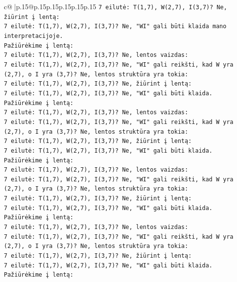 \documentclass{article}
\begin{document}
{\begin{supertabular}{c@{$\;$}|p{.15\linewidth}@{}p{.15\linewidth}p{.15\linewidth}p{.15\linewidth}p{.15\linewidth}p{.15\linewidth}}
{{{\texttt{7 eilutė: T(1,7), W(2,7), I(3,7)? Ne, žiūrint į lentą:} \\
\texttt{7 eilutė: T(1,7), W(2,7), I(3,7)? Ne, "WI" gali būti klaida mano interpretacijoje.} \\
\texttt{Pažiūrėkime į lentą:} \\
\texttt{7 eilutė: T(1,7), W(2,7), I(3,7)? Ne, lentos vaizdas:} \\
\texttt{7 eilutė: T(1,7), W(2,7), I(3,7)? Ne, "WI" gali reikšti, kad W yra (2,7), o I yra (3,7)? Ne, lentos struktūra yra tokia:} \\
\texttt{7 eilutė: T(1,7), W(2,7), I(3,7)? Ne, žiūrint į lentą:} \\
\texttt{7 eilutė: T(1,7), W(2,7), I(3,7)? Ne, "WI" gali būti klaida.} \\
\texttt{Pažiūrėkime į lentą:} \\
\texttt{7 eilutė: T(1,7), W(2,7), I(3,7)? Ne, lentos vaizdas:} \\
\texttt{7 eilutė: T(1,7), W(2,7), I(3,7)? Ne, "WI" gali reikšti, kad W yra (2,7), o I yra (3,7)? Ne, lentos struktūra yra tokia:} \\
\texttt{7 eilutė: T(1,7), W(2,7), I(3,7)? Ne, žiūrint į lentą:} \\
\texttt{7 eilutė: T(1,7), W(2,7), I(3,7)? Ne, "WI" gali būti klaida.} \\
\texttt{Pažiūrėkime į lentą:} \\
\texttt{7 eilutė: T(1,7), W(2,7), I(3,7)? Ne, lentos vaizdas:} \\
\texttt{7 eilutė: T(1,7), W(2,7), I(3,7)? Ne, "WI" gali reikšti, kad W yra (2,7), o I yra (3,7)? Ne, lentos struktūra yra tokia:} \\
\texttt{7 eilutė: T(1,7), W(2,7), I(3,7)? Ne, žiūrint į lentą:} \\
\texttt{7 eilutė: T(1,7), W(2,7), I(3,7)? Ne, "WI" gali būti klaida.} \\
\texttt{Pažiūrėkime į lentą:} \\
\texttt{7 eilutė: T(1,7), W(2,7), I(3,7)? Ne, lentos vaizdas:} \\
\texttt{7 eilutė: T(1,7), W(2,7), I(3,7)? Ne, "WI" gali reikšti, kad W yra (2,7), o I yra (3,7)? Ne, lentos struktūra yra tokia:} \\
\texttt{7 eilutė: T(1,7), W(2,7), I(3,7)? Ne, žiūrint į lentą:} \\
\texttt{7 eilutė: T(1,7), W(2,7), I(3,7)? Ne, "WI" gali būti klaida.} \\
\texttt{Pažiūrėkime į lentą:} \\
}}}
\end{supertabular}}
\end{document}
